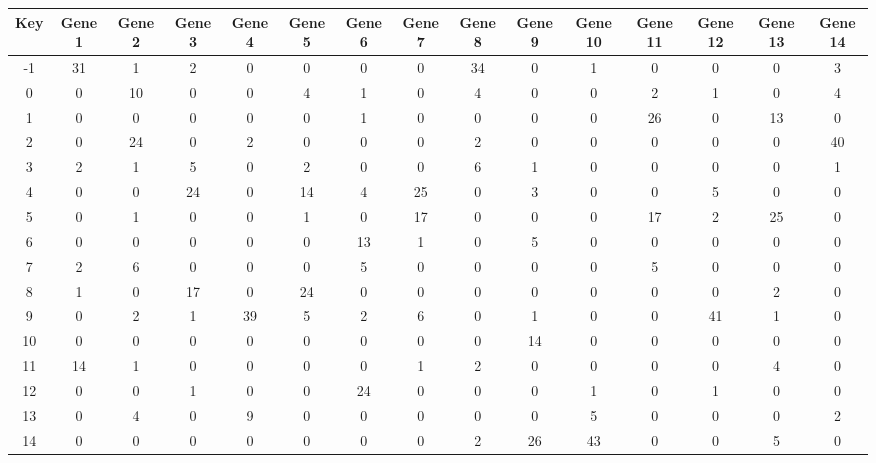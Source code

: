 \begin{tabular}{|c|c|c|c|c|c|c|c|c|c|c|c|c|c|c|}
\hline
Key & Gene 1 & Gene 2 & Gene 3 & Gene 4 & Gene 5 & Gene 6 & Gene 7 & Gene 8 & Gene 9 & Gene 10 & Gene 11 & Gene 12 & Gene 13 & Gene 14 \\
\hline
-1 & 31 & 1 & 2 & 0 & 0 & 0 & 0 & 34 & 0 & 1 & 0 & 0 & 0 & 3 \\
0 & 0 & 10 & 0 & 0 & 4 & 1 & 0 & 4 & 0 & 0 & 2 & 1 & 0 & 4 \\
1 & 0 & 0 & 0 & 0 & 0 & 1 & 0 & 0 & 0 & 0 & 26 & 0 & 13 & 0 \\
2 & 0 & 24 & 0 & 2 & 0 & 0 & 0 & 2 & 0 & 0 & 0 & 0 & 0 & 40 \\
3 & 2 & 1 & 5 & 0 & 2 & 0 & 0 & 6 & 1 & 0 & 0 & 0 & 0 & 1 \\
4 & 0 & 0 & 24 & 0 & 14 & 4 & 25 & 0 & 3 & 0 & 0 & 5 & 0 & 0 \\
5 & 0 & 1 & 0 & 0 & 1 & 0 & 17 & 0 & 0 & 0 & 17 & 2 & 25 & 0 \\
6 & 0 & 0 & 0 & 0 & 0 & 13 & 1 & 0 & 5 & 0 & 0 & 0 & 0 & 0 \\
7 & 2 & 6 & 0 & 0 & 0 & 5 & 0 & 0 & 0 & 0 & 5 & 0 & 0 & 0 \\
8 & 1 & 0 & 17 & 0 & 24 & 0 & 0 & 0 & 0 & 0 & 0 & 0 & 2 & 0 \\
9 & 0 & 2 & 1 & 39 & 5 & 2 & 6 & 0 & 1 & 0 & 0 & 41 & 1 & 0 \\
10 & 0 & 0 & 0 & 0 & 0 & 0 & 0 & 0 & 14 & 0 & 0 & 0 & 0 & 0 \\
11 & 14 & 1 & 0 & 0 & 0 & 0 & 1 & 2 & 0 & 0 & 0 & 0 & 4 & 0 \\
12 & 0 & 0 & 1 & 0 & 0 & 24 & 0 & 0 & 0 & 1 & 0 & 1 & 0 & 0 \\
13 & 0 & 4 & 0 & 9 & 0 & 0 & 0 & 0 & 0 & 5 & 0 & 0 & 0 & 2 \\
14 & 0 & 0 & 0 & 0 & 0 & 0 & 0 & 2 & 26 & 43 & 0 & 0 & 5 & 0 \\
\hline
\end{tabular}